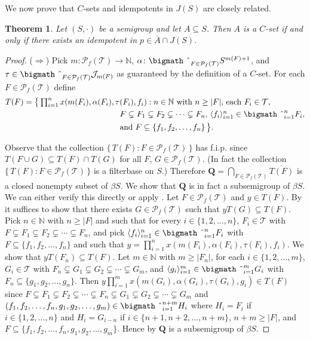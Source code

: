 \documentclass[12pt,showtrims]{memoir}
\theoremstyle{plain}
\newtheorem{thm}{Theorem}[section]
\theoremstyle{definition}
\newcommand{\la}{\langle}
\newcommand{\ra}{\rangle}
\newcommand{\bbN}{\mathbb{N}}
\newcommand{\calJ}{\mathcal{J}}
\newcommand{\calT}{\mathcal{T}}
\newcommand{\Pf}{\mathcal{P}_f}
\newcommand{\bigtimes}{\hbox{\bigmath \char'2}}
\begin{document}
We now prove that $C$-sets and idempotents in $J(S)$ are closely related.
\begin{thm}
  \label{thm:csets}
  Let $(S, \cdot)$ be a semigroup and let $A \subseteq S$. 
  Then $A$ is a $C$-set if and only if there exists an idempotent in $p \in \overline{A} \cap J(S)$.
\end{thm}
\begin{proof}
  ($\Rightarrow$)
  Pick $m \colon \Pf(\calT) \to \bbN$, $\alpha \colon \bigtimes_{F \in \Pf(\calT)} S^{m(F)+1}$, and $\tau \in \bigtimes_{F \in \Pf(\calT)} \calJ_{m(F)}$ as guaranteed by the definition of a $C$-set. 
  For each $F \in \Pf(\calT)$ define 
  \begin{align*}
    T(F) &= \bigl\{\, \textstyle \prod_{i=1}^n x(m(F_i), \alpha(F_i), \tau(F_i), f_i) : \mbox{$n \in \bbN$ with $n \ge |F|$, each $F_i \in \calT$,}\\
 &\hspace{12em}\mbox{$F \subsetneq F_1 \subsetneq F_2 \subsetneq \cdots \subsetneq F_n$, $\la f_i \ra_{i=1}^n \in \bigtimes_{i=1}^n F_i$,} \\
 &\hspace{12em} \mbox{and $F \subseteq \{f_1, f_2, \ldots, f_n\}$} \,\bigr\}.
  \end{align*}

  Observe that the collection $\{\, T(F) : F \in \Pf(\calT) \,\}$ has f.i.p. since $T(F \cup G) \subseteq T(F) \cap T(G)$ for all $F$, $G \in \Pf(\calT)$.
  (In fact the collection $\{\, T(F) : F \in \Pf(\calT) \,\}$ is a filterbase on $S$.)
  Therefore $\mathbf{Q} = \bigcap_{F \in \Pf(\calT)} \overline{T(F)}$ is a closed nonempty subset of $\beta S$. 
  We show that $\mathbf{Q}$ is in fact a subsemigroup of $\beta S$.
  We can either verify this directly or apply \cite[Theorem 4.20]{Hindman:1998fk}.
  Let $F \in \Pf(\calT)$ and $y \in T(F)$.
  By \cite[Theorem 4.20]{Hindman:1998fk} it suffices to show that there exists $G \in \Pf(\calT)$ such that $yT(G) \subseteq T(F)$. 
  Pick $n \in \bbN$ with $n \ge |F|$ and such that for every $i \in \{1, 2, \ldots, n\}$, $F_i \in \calT$ with $F \subsetneq F_1 \subsetneq F_2 \subsetneq \cdots \subsetneq F_n$, and pick $\la f_i \ra_{i=1}^n \in \bigtimes_{i=1}^n F_i$ with $F \subseteq \{f_1, f_2, \ldots, f_n\}$ and such that $y = \prod_{i=1}^n x(m(F_i), \alpha(F_i), \tau(F_i), f_i)$. 
  We show that $yT(F_n) \subseteq T(F)$. 
  Let $m \in \bbN$ with $m \ge |F_n|$, for each $i \in \{1, 2, \ldots, m\}$, $G_i \in \calT$ with $F_n \subsetneq G_1 \subsetneq G_2 \subsetneq \cdots \subsetneq G_m$, and $\la g_i \ra_{i=1}^m \in \bigtimes_{i=1}^m G_i$ with $F_n \subseteq \{g_1, g_2, \ldots, g_n\}$. 
  Then $y \prod_{i=1}^m x(m(G_i), \alpha(G_i), \tau(G_i), g_i) \in T(F)$ since $F \subsetneq F_1 \subsetneq F_2 \subsetneq \cdots \subsetneq F_n \subsetneq G_1 \subsetneq G_2 \subsetneq \cdots \subsetneq G_m$ and $(f_1, f_2, \ldots, f_n, g_1, g_2, \ldots, g_m) \in \bigtimes_{i=1}^{n+m} H_i$ where $H_i = F_i$ if $i \in \{1, 2, \ldots, n\}$ and $H_i = G_{i-n}$ if $i \in \{n+1, n+2, \ldots, n+m\}$, $n+m \ge |F|$, and $F \subseteq \{f_1, f_2, \ldots, f_n, g_1, g_2, \ldots, g_m\}$. 
  Hence by \cite[Theorem 4.20]{Hindman:1998fk} $\mathbf{Q}$ is a subsemigroup of $\beta S$. 


\end{proof}
\end{document}
